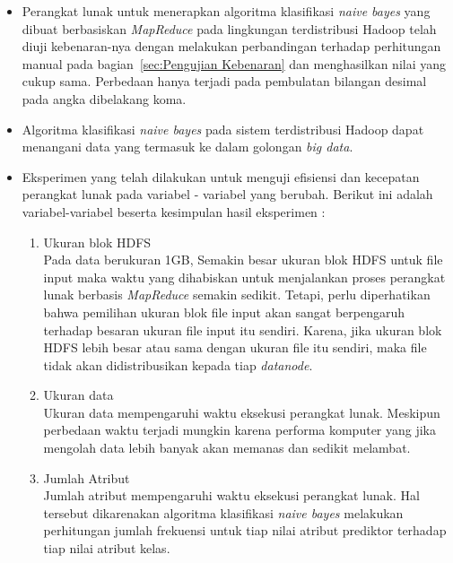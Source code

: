 \begin{itemize}
	\item Perangkat lunak untuk menerapkan algoritma klasifikasi \textit{naive bayes} yang dibuat berbasiskan \textit{MapReduce} pada lingkungan terdistribusi Hadoop telah diuji kebenaran-nya dengan melakukan perbandingan terhadap perhitungan manual pada bagian~\ref{sec:Pengujian Kebenaran} dan menghasilkan nilai yang cukup sama. Perbedaan hanya terjadi pada pembulatan bilangan desimal pada angka dibelakang koma.
	\item Algoritma klasifikasi \textit{naive bayes} pada sistem terdistribusi Hadoop dapat menangani data yang termasuk ke dalam golongan \textit{big data}.
	\item Eksperimen yang telah dilakukan untuk menguji efisiensi dan kecepatan perangkat lunak pada variabel - variabel yang berubah. Berikut ini adalah variabel-variabel beserta kesimpulan hasil eksperimen :
	\begin{enumerate}[label=(\alph*)]
		\item Ukuran blok HDFS\\
		Pada data berukuran 1GB, Semakin besar ukuran blok HDFS untuk file input maka waktu yang dihabiskan untuk menjalankan proses perangkat lunak berbasis \textit{MapReduce} semakin sedikit. Tetapi, perlu diperhatikan bahwa pemilihan ukuran blok file input akan sangat berpengaruh terhadap besaran ukuran file input itu sendiri. Karena, jika ukuran blok HDFS lebih besar atau sama dengan ukuran file itu sendiri, maka file tidak akan didistribusikan kepada tiap \textit{datanode}.
		
		\item Ukuran data\\
		Ukuran data mempengaruhi waktu eksekusi perangkat lunak. Meskipun perbedaan waktu terjadi mungkin karena performa komputer yang jika mengolah data lebih banyak akan memanas dan sedikit melambat.
		
		\item Jumlah Atribut\\
		Jumlah atribut mempengaruhi waktu eksekusi perangkat lunak. Hal tersebut dikarenakan algoritma klasifikasi \textit{naive bayes} melakukan perhitungan jumlah frekuensi untuk tiap nilai atribut prediktor terhadap tiap nilai atribut kelas.
		

\end{enumerate}
\end{itemize}
